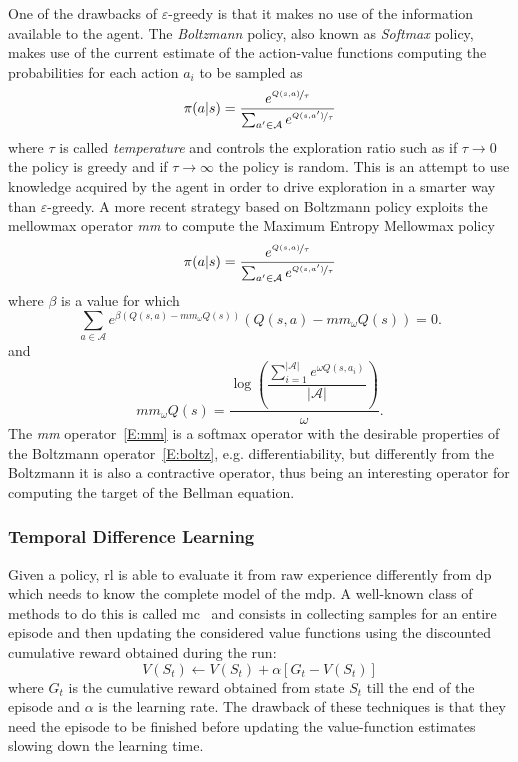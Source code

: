 One of the drawbacks of $\varepsilon$-greedy is that it makes no use of the information available to the agent. The \textit{Boltzmann} policy, also known as \textit{Softmax} policy, makes use of the current estimate of the action-value functions computing the probabilities for each action $a_i$ to be sampled as
\begin{equation}\label{E:boltz}
 \pi(a | s) = \dfrac{e^{\nicefrac{Q(s,a)}{\tau}}}{\sum_{a' \in \mathcal{A}}e^{\nicefrac{Q(s,a')}{\tau}}}
\end{equation}
where $\tau$ is called \textit{temperature} and controls the exploration ratio such as if $\tau \rightarrow 0$ the policy is greedy and if $\tau \rightarrow \infty$ the policy is random. This is an attempt to use knowledge acquired by the agent in order to drive exploration in a smarter way than $\varepsilon$-greedy. A more recent strategy based on Boltzmann policy exploits the mellowmax operator \textit{mm} to compute the Maximum Entropy Mellowmax policy~\cite{asadi2016alternative}
\begin{equation}
 \pi(a | s) = \dfrac{e^{\nicefrac{Q(s,a)}{\tau}}}{\sum_{a' \in \mathcal{A}}e^{\nicefrac{Q(s,a')}{\tau}}}
\end{equation}
where $\beta$ is a value for which
\begin{equation}
 \sum_{a \in \mathcal{A}} e^{\beta(Q(s,a) - mm_\omega Q(s))}(Q(s,a)-mm_\omega Q(s))=0.
\end{equation}
and
\begin{equation}\label{E:mm}
 mm_\omega Q(s) = \dfrac{\log(\dfrac{\sum_{i=1}^{|\mathcal{A}|}e^{\omega Q(s,a_i)}}{|\mathcal{A}|})}{\omega}.
\end{equation}
The \textit{mm} operator~\ref{E:mm} is a softmax operator with the desirable properties of the Boltzmann operator~\ref{E:boltz}, e.g. differentiability, but differently from the Boltzmann it is also a contractive operator, thus being an interesting operator for computing the target of the Bellman equation. 

\subsubsection{Temporal Difference Learning}
Given a policy, \gls{rl} is able to evaluate it from raw experience differently from \gls{dp} which needs to know the complete model of the \gls{mdp}. A well-known class of methods to do this is called \gls{mc}~\cite{robert2013monte} and consists in collecting samples for an entire episode and then updating the considered value functions using the discounted cumulative reward obtained during the run:
\begin{equation}\label{E:mc}
 V(S_t) \leftarrow V(S_t) + \alpha [G_t - V(S_t)]
\end{equation}
where $G_t$ is the cumulative reward obtained from state $S_t$ till the end of the episode and $\alpha$ is the learning rate.
The drawback of these techniques is that they need the episode to be finished before updating the value-function estimates slowing down the learning time.

